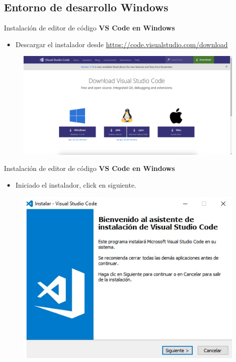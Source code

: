 \subsection{Entorno de desarrollo Windows}


\begin{frame}[fragile]{Instalación de editor de código}
  \textbf{VS Code en Windows}
  \begin{itemize}[<+(1)->]
    \item Descargar el instalador desde \url{https://code.visualstudio.com/download}
  \end{itemize}  
    \begin{figure}
      \includegraphics[width=1\textwidth]{./resources/1.png}
    \end{figure}

\end{frame}


\begin{frame}[fragile]{Instalación de editor de código}
  \textbf{VS Code en Windows}
  \begin{itemize}[<+(1)->]
    \item Iniciado el instalador, click en siguiente.
  \end{itemize} 
    \begin{figure}
      \includegraphics[width=1\textwidth]{./resources/2.png}
    \end{figure}
\end{frame}

